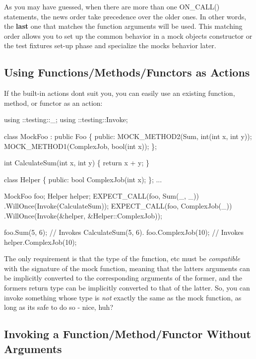 As you may have guessed, when there are more than one {\ttfamily O\+N\+\_\+\+C\+A\+L\+L()} statements, the news order take precedence over the older ones. In other words, the {\bfseries last} one that matches the function arguments will be used. This matching order allows you to set up the common behavior in a mock object\textquotesingle{}s constructor or the test fixture\textquotesingle{}s set-\/up phase and specialize the mock\textquotesingle{}s behavior later.

\subsection*{Using Functions/\+Methods/\+Functors as Actions}

If the built-\/in actions don\textquotesingle{}t suit you, you can easily use an existing function, method, or functor as an action\+:


\begin{DoxyCode}
using ::testing::\_;
using ::testing::Invoke;

class MockFoo : public Foo \{
 public:
  MOCK\_METHOD2(Sum, int(int x, int y));
  MOCK\_METHOD1(ComplexJob, bool(int x));
\};

int CalculateSum(int x, int y) \{ return x + y; \}

class Helper \{
 public:
  bool ComplexJob(int x);
\};
...

  MockFoo foo;
  Helper helper;
  EXPECT\_CALL(foo, Sum(\_, \_))
      .WillOnce(Invoke(CalculateSum));
  EXPECT\_CALL(foo, ComplexJob(\_))
      .WillOnce(Invoke(&helper, &Helper::ComplexJob));

  foo.Sum(5, 6);       // Invokes CalculateSum(5, 6).
  foo.ComplexJob(10);  // Invokes helper.ComplexJob(10);
\end{DoxyCode}


The only requirement is that the type of the function, etc must be {\itshape compatible} with the signature of the mock function, meaning that the latter\textquotesingle{}s arguments can be implicitly converted to the corresponding arguments of the former, and the former\textquotesingle{}s return type can be implicitly converted to that of the latter. So, you can invoke something whose type is {\itshape not} exactly the same as the mock function, as long as it\textquotesingle{}s safe to do so -\/ nice, huh?

\subsection*{Invoking a Function/\+Method/\+Functor Without Arguments}

